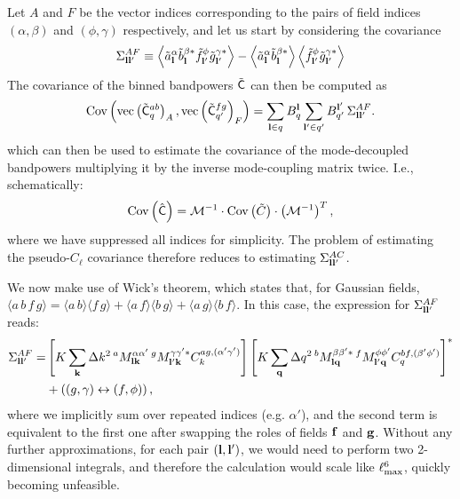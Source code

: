 \documentclass[a4paper,11pt]{article}
\newcommand{\summ}[1]{\sum_{\bf #1}\Delta #1^2}
\begin{document}
      Let $A$ and $F$ be the vector indices corresponding to the pairs of field indices $(\alpha,\beta)$ and $(\phi,\gamma)$ respectively, and let us start by considering the covariance
      \begin{equation}
        \Sigma^{AF}_{{\bf l}{\bf l}'}\equiv\left\langle\tilde{a}^\alpha_{\bf l}\tilde{b}^{\beta *}_{\bf l}\tilde{f}^\phi_{{\bf l}'}\tilde{g}^{\gamma *}_{{\bf l}'}\right\rangle-\left\langle\tilde{a}^\alpha_{\bf l}\tilde{b}^{\beta *}_{\bf l}\right\rangle\left\langle\tilde{f}^\phi_{{\bf l}'}\tilde{g}^{\gamma *}_{{\bf l}'}\right\rangle
      \end{equation}
      The covariance of the binned bandpowers $\tilde{\sf C}$ can then be computed as
      \begin{equation}\label{eq:cov_binned}
        {\rm Cov}\left({\rm vec}\left(\tilde{\sf C}^{ab}_q\right)_A,{\rm vec}\left(\tilde{\sf C}^{fg}_{q'}\right)_F\right)=\sum_{{\bf l}\in q} B^{\bf l}_q\sum_{{\bf l}'\in q'} B^{{\bf l}'}_{q'}\,\Sigma^{AF}_{{\bf l}{\bf l}'}.
      \end{equation}
      which can then be used to estimate the covariance of the mode-decoupled bandpowers multiplying it by the inverse mode-coupling matrix twice. I.e., schematically:
      \begin{equation}
        {\rm Cov}\left(\hat{\sf C}\right)=\mathcal{M}^{-1}\cdot{\rm Cov}\left(\tilde{C}\right)\cdot\left(\mathcal{M}^{-1}\right)^{T},
      \end{equation}
      where we have suppressed all indices for simplicity. The problem of estimating the pseudo-$C_\ell$ covariance therefore reduces to estimating $\Sigma^{AC}_{{\bf l}{\bf l}'}$.
    
      We now make use of Wick's theorem, which states that, for Gaussian fields, $\langle a\,b\,f\,g\rangle=\langle a\,b\rangle\langle f\,g\rangle+\langle a\,f\rangle\langle b\,g\rangle+\langle a\,g\rangle\langle b\,f\rangle$. In this case, the expression for $\Sigma^{AF}_{{\bf l}{\bf l'}}$ reads:
      \begin{align}\nonumber
        \Sigma^{AF}_{{\bf l}{\bf l}'}=&\left[K\summ{k}\,^aM^{\alpha\alpha'}_{{\bf l}{\bf k}}\,^gM^{\gamma\gamma'*}_{{\bf l}'{\bf k}}C^{ag,(\alpha'\gamma')}_k\right]\left[K\summ{q}\,^bM^{\beta\beta'*}_{{\bf l}{\bf q}}\,^fM^{\phi\phi'}_{{\bf l}'{\bf q}}C^{bf,(\beta'\phi')}_q\right]^*\\\label{eq:covar_general}
        &+\left((g,\gamma)\leftrightarrow(f,\phi)\right),
      \end{align}
      where we implicitly sum over repeated indices (e.g. $\alpha'$), and the second term is equivalent to the first one after swapping the roles of fields ${\bf f}$ and ${\bf g}$. Without any further approximations, for each pair $({\bf l},{\bf l}')$, we would need to perform two 2-dimensional integrals, and therefore the calculation would scale like $\ell_{\rm max}^6$, quickly becoming unfeasible.
    
\end{document}
